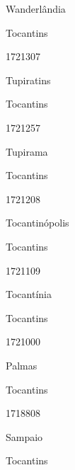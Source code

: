 \documentclass[
  letterpaper,
]{report}
\begin{document}
Wanderlândia

\n    

\n    

\n      

Tocantins

\n      

1721307

\n      

Tupiratins

\n    

\n    

\n      

Tocantins

\n      

1721257

\n      

Tupirama

\n    

\n    

\n      

Tocantins

\n      

1721208

\n      

Tocantinópolis

\n    

\n    

\n      

Tocantins

\n      

1721109

\n      

Tocantínia

\n    

\n    

\n      

Tocantins

\n      

1721000

\n      

Palmas

\n    

\n    

\n      

Tocantins

\n      

1718808

\n      

Sampaio

\n    

\n    

\n      

Tocantins
\end{document}
